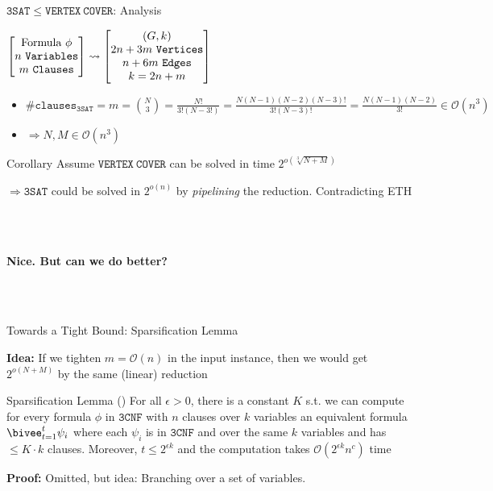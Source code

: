 \begin{frame}[c]{$\mathtt{3SAT} \leq \mathtt{VERTEX~COVER}$: Analysis}
\begin{center}
$\begin{bmatrix}
   \text{Formula~} \phi \\
   n \mathtt{~Variables} \\
   m \mathtt{~Clauses} \\
\end{bmatrix} \rightsquigarrow	
\begin{bmatrix}
   \text (G, k)\\
   2n + 3m \mathtt{~Vertices} \\
   n + 6m \mathtt{~Edges} \\
   k = 2n + m
\end{bmatrix} 
$

\begin{itemize}
       \item $\#\mathtt{clauses}_{\mathtt{3SAT}} = m = \binom{N}{3} = \frac{N!}{3!(N-3!)}=\frac{N(N-1)(N-2)(N-3)!}{3!(N-3)!}=\frac{N(N-1)(N-2)}{3!}\in \mathcal{O}(n^3)$
       \item $\Rightarrow N,M \in \mathcal{O}(n^3)$
\end{itemize}
      
\pause\begin{block}{Corollary}
Assume $\mathtt{VERTEX~COVER}$ can be solved in time $2^{o(\sqrt[3]{N+M})}$

$\Rightarrow \mathtt{3SAT}$ could be solved in $2^{o(n)}$ by \textit{pipelining} the reduction. \textbf{\textcolor{red}{\text{\faBolt}}}
 Contradicting ETH
 
\end{block}

\\~ 
\begin{center}
    \pause\textbf{Nice. But can we do better?}
\end{center}
\\~ 
\end{center}
\end{frame}

\begin{frame}[c]{Towards a Tight Bound: Sparsification Lemma}

\textbf{Idea: }If we tighten $m = \mathcal{O}(n)$ in the input instance, then we would get $2^{o(N+M)}$ by the same (linear) reduction

\begin{block}{Sparsification Lemma (\cite{sparslem})}{
For all $\epsilon > 0$, there is a constant $K$ s.t. we can compute for every formula $\phi$ in $\mathtt{3CNF}$ with $n$ clauses over $k$ variables an equivalent formula $\bivee_{t=1}^t \psi_i$ where each $\psi_i$ is in $\mathtt{3CNF}$ and over the same $k$ variables and has $\leq K \cdot k$ clauses. Moreover, $t \leq 2^{\epsilon k}$ and the computation takes $\mathcal{O}(2^{\epsilon k}n^c)$ time
}
\end{block}
\textbf{Proof: } Omitted, but idea: Branching over a set of variables.
\end{frame}

